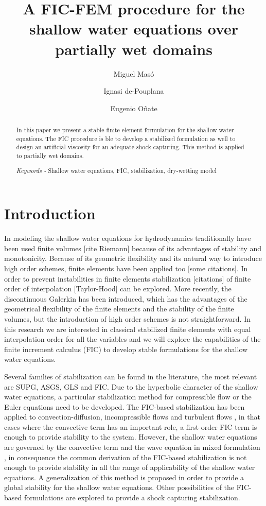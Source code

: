 \documentclass[a4paper,12pt]{article}
\title{A FIC-FEM procedure for the shallow water equations over partially wet domains}
\author[1,2]{Miguel Masó}
\author[1,2]{Ignasi de-Pouplana}
\author[1,2]{Eugenio Oñate}
\affil[1]{Centre Int. de Mètodes Numèrics a l'Enginyeria (CIMNE), Barcelona, Spain}
\affil[2]{Universitat Politècnica de Catalunya (UPC), Barcelona, Spain}
\newcommand{\keywords}[1]{\textit{Keywords -} #1}
\begin{document}
\maketitle

\begin{abstract}
\noindent
In this paper we present a stable finite element formulation for the shallow water equations. The FIC procedure is ble to develop a stabilized formulation as well to design an artificial viscosity for an adequate shock capturing. This method is applied to partially wet domains.
\vspace{1em}

\noindent
\keywords{Shallow water equations, FIC, stabilization, dry-wetting model}
\end{abstract}


\section{Introduction}

In modeling the shallow water equations for hydrodynamics traditionally have been used finite volumes [cite Riemann] because of its advantages of stability and monotonicity. Because of its geometric flexibility and its natural way to introduce high order schemes, finite elements have been applied too [some citations]. In order to prevent instabilities in finite elements stabilization [citations] of finite order of interpolation [Taylor-Hood] can be explored. More recently, the discontinuous Galerkin has been introduced, which has the advantages of the geometrical flexibility of the finite elements and the stability of the finite volumes, but the introduction of high order schemes is not straightforward. In this research we are interested in classical stabilized finite elements with equal interpolation order for all the variables and we will explore the capabilities of the finite increment calculus (FIC) to develop stable formulations for the shallow water equations.

Several families of stabilization can be found in the literature, the most relevant are SUPG, ASGS, GLS and FIC. Due to the hyperbolic character of the shallow water equations, a particular stabilization method for compressible flow or the Euler equations need to be developed. The FIC-based stabilization has been applied to convection-diffusion, incompressible flows and turbulent flows \cite{onate1998}\cite{onate2001}, in that cases where the convective term has an important role, a first order FIC term is enough to provide stability to the system. However, the shallow water equations are governed by the convective term and the wave equation in mixed formulation \cite{codina2008}, in consequence the common derivation of the FIC-based stabilization is not enough to provide stability in all the range of applicability of the shallow water equations. A generalization of this method is proposed in order to provide a global stability for the shallow water equations. Other possibilities of the FIC-based formulations are explored to provide a shock capturing stabilization.
\end{document}
